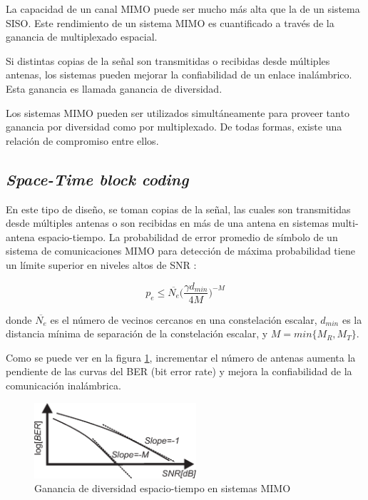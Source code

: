 La capacidad de un canal MIMO puede ser mucho más alta que la de un sistema SISO. Este rendimiento de un sistema MIMO es cuantificado a través de la ganancia de multiplexado espacial.

Si distintas copias de la señal son transmitidas o recibidas desde múltiples antenas, los sistemas pueden mejorar la confiabilidad de un enlace inalámbrico. Esta ganancia es llamada ganancia de diversidad.

Los sistemas MIMO pueden ser utilizados simultáneamente para proveer tanto ganancia por diversidad como por multiplexado. De todas formas, existe una relación de compromiso entre ellos.

\subsection{\textit{Space-Time block coding}}

En este tipo de diseño, se toman copias de la señal, las cuales son transmitidas desde múltiples antenas o son recibidas en más de una antena en sistemas multi-antena espacio-tiempo. La probabilidad de error promedio de símbolo de un sistema de comunicaciones MIMO para detección de máxima probabilidad tiene un límite superior en niveles altos de SNR \cite{Mohammadi2}:

\begin{equation}
p_e \leq \overline{N_e}\Big(\frac{\gamma d_{min}}{4 M}\Big)^{-M}
\end{equation}

donde $\overline{N_e}$ es el número de vecinos cercanos en una constelación escalar, $d_{min}$ es la distancia mínima de separación de la constelación escalar, y $M = min\{M_R,M_T\}$.

Como se puede ver en la figura \ref{fig:alamouti_chart}, incrementar el número de antenas aumenta la pendiente de las curvas del BER (bit error rate) y mejora la confiabilidad de la comunicación inalámbrica.

\begin{figure}[htb!]
        \centering
        \includegraphics[width=6cm]{./figures/C02-alamouti_chart}
        \caption{Ganancia de diversidad espacio-tiempo en sistemas MIMO}
        \label{fig:alamouti_chart}
\end{figure}

